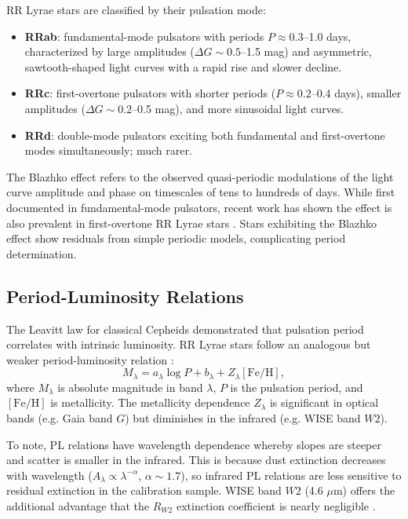 \documentclass[10pt,preprint2]{aastex}
\begin{document}
RR Lyrae stars are classified by their pulsation mode:
\begin{itemize}
  \item \textbf{RRab}: fundamental-mode pulsators with periods $P \approx 0.3$--1.0 days, characterized by large amplitudes ($\Delta G \sim 0.5$--1.5 mag) and asymmetric, sawtooth-shaped light curves with a rapid rise and slower decline.
  \item \textbf{RRc}: first-overtone pulsators with shorter periods ($P \approx 0.2$--0.4 days), smaller amplitudes ($\Delta G \sim 0.2$--0.5 mag), and more sinusoidal light curves.
  \item \textbf{RRd}: double-mode pulsators exciting both fundamental and first-overtone modes simultaneously; much rarer.
\end{itemize}

The Blazhko effect refers to the observed quasi-periodic modulations of the light curve amplitude and phase on timescales of tens to hundreds of days. While first documented in fundamental-mode pulsators, recent work has shown the effect is also prevalent in first-overtone RR Lyrae stars \citep{Netzel2018}. Stars exhibiting the Blazhko effect show residuals from simple periodic models, complicating period determination.

\subsection{Period-Luminosity Relations}

The Leavitt law \citep{Leavitt1912} for classical Cepheids demonstrated that pulsation period correlates with intrinsic luminosity. RR Lyrae stars follow an analogous but weaker period-luminosity relation \citep{CatelanSmith2015}:
\begin{equation}
  M_\lambda = a_\lambda \log P + b_\lambda + Z_\lambda [\mathrm{Fe/H}],
\end{equation}
where $M_\lambda$ is absolute magnitude in band $\lambda$, $P$ is the pulsation period, and $[\mathrm{Fe/H}]$ is metallicity. The metallicity dependence $Z_\lambda$ is significant in optical bands (e.g. Gaia band $G$) but diminishes in the infrared (e.g. WISE band $W2$).

To note, PL relations have wavelength dependence whereby slopes are steeper and scatter is smaller in the infrared. This is because dust extinction decreases with wavelength ($A_\lambda \propto \lambda^{-\alpha}$, $\alpha \sim 1.7$), so infrared PL relations are less sensitive to residual extinction in the calibration sample. WISE band $W2$ (4.6 $\mu$m) offers the additional advantage that the $R_{W2}$ extinction coefficient is nearly negligible \citep{KleinBloom2014}.
\end{document}
